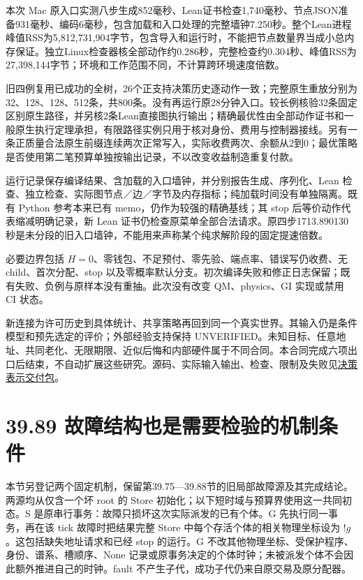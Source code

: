 \documentclass[
  11pt,
  oneside]{book}
\begin{document}
本次 Mac 原入口实测八步生成852毫秒、Lean证书检查1,740毫秒、节点JSON准备931毫秒、编码6毫秒，包含加载和入口处理的完整墙钟7.250秒。整个Lean进程峰值RSS为5,812,731,904字节，包含导入和运行时，不能把节点数量界当成小总内存保证。独立Linux检查器核全部动作约0.286秒，完整检查约0.304秒、峰值RSS为27,398,144字节；环境和工作范围不同，不计算跨环境速度倍数。

旧四例复用已成功的全树，26个正支持决策历史逐动作一致；完整原生重放分别为32、128、128、512条，共800条。没有再运行原28分钟入口。较长例核验32条固定区别原生路径，并另核2条Lean直接图执行输出；精确最优性由全部动作证书和一般原生执行定理承担，有限路径实例只用于核对身份、费用与控制器接线。另有一条正质量合法原生前缀连续两次正常写入，实际收费两次、余额从2到0；最优策略是否使用第二笔预算单独按输出记录，不以改变收益制造重复付款。

运行记录保存编译结果、含加载的入口墙钟，并分别报告生成、序列化、Lean 检查、独立检查、实际图节点／边／字节及内存指标；纯加载时间没有单独隔离。既有 Python 参考本来已有 memo，仍作为较强的精确基线；其 stop 后等价动作代表缩减明确记录，新 Lean 证书仍检查原菜单全部合法请求。原四步1713.890130秒是未分段的旧入口墙钟，不能用来声称某个纯求解阶段的固定提速倍数。

必要边界包括 \(H=0\)、零钱包、不足预付、零先验、端点率、错误写仍收费、无 child、首次分配、stop 以及零概率默认分支。初次编译失败和修正日志保留；既有失败、负例与原样本没有重抽。此次没有改变 QM、physics、GI 实现或禁用 CI 状态。

新连接为许可历史到具体统计、共享策略再回到同一个真实世界。其输入仍是条件模型和预先选定的评价；外部经验支持保持 UNVERIFIED。未知目标、任意地址、共同老化、无限期限、近似后悔和内部硬件属于不同合同。本合同完成六项出口后结束，不自动扩展这些研究。源码、实际输入输出、检查、限制及失败见\href{../formalization/ueot-core/docs/compression/theory_completion/unified_closure/decision_representation_closure_v1/README.md}{决策表示交付包}。

\section{39.89 故障结构也是需要检验的机制条件}\label{ux6545ux969cux7ed3ux6784ux4e5fux662fux9700ux8981ux68c0ux9a8cux7684ux673aux5236ux6761ux4ef6}

本节另登记两个固定机制，保留第39.75---39.88节的旧局部故障源及其完成结论。两源均从仅含一个坏 root 的 Store 初始化；以下短时域与预算界使用这一共同初态。S 是原串行事务：故障只损坏这次实际派发的已有个体。G 先执行同一事务，再在该 tick 故障时把结果完整 Store 中每个存活个体的相关物理坐标设为 \(!g\)。这包括缺失地址请求和已经 stop 的运行。G 不改其他物理坐标、受保护程序、身份、谱系、槽顺序、None 记录或原事务决定的个体时钟；未被派发个体不会因此额外推进自己的时钟。fault 不产生子代，成功子代仍来自原交易及原分配器。
\end{document}
